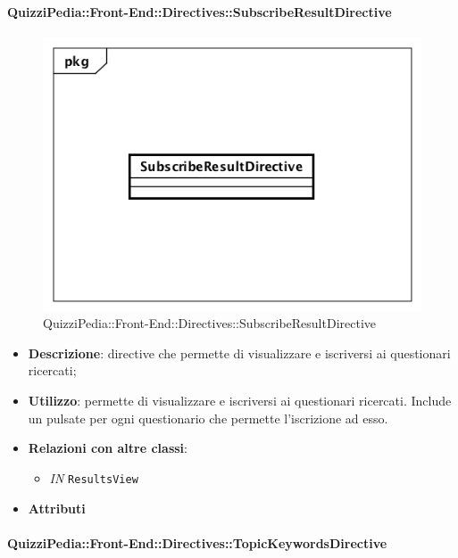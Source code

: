 \paragraph{QuizziPedia::Front-End::Directives::SubscribeResultDirective }

\label{QuizziPedia::Front-End::Directives::SubscribeResultDirective}

\begin{figure}[h]
	\centering
	\includegraphics[scale=0.5,keepaspectratio]{UML/Classi/Front-End/QuizziPedia_Front-end_Directives_SubscribeResultDirective.png}
	\caption{QuizziPedia::Front-End::Directives::SubscribeResultDirective}
\end{figure}

\begin{itemize}
	\item \textbf{Descrizione}: directive che permette di visualizzare e iscriversi ai questionari ricercati;
	\item \textbf{Utilizzo}: permette di visualizzare e iscriversi ai questionari ricercati. Include un pulsate per ogni questionario che permette l'iscrizione ad esso.
	\item \textbf{Relazioni con altre classi}:
	\begin{itemize}
		\item \textit{IN} \texttt{ResultsView} 
	\end{itemize}
	\item \textbf{Attributi}
\end{itemize}

\paragraph{QuizziPedia::Front-End::Directives::TopicKeywordsDirective}


